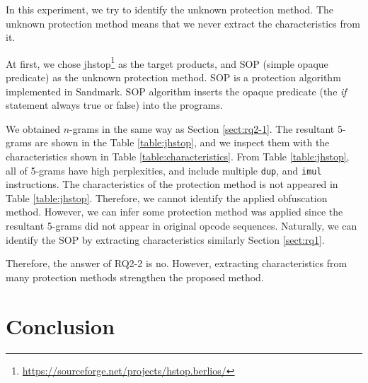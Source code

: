 \documentclass[conference]{IEEEtran}
\begin{document}
In this experiment, we try to identify the unknown protection method.
The unknown protection method means that we never extract the
characteristics from it.

At first, we chose
jhstop\footnote[6]{\url{https://sourceforge.net/projects/hstop.berlios/}}
as the target products, and SOP (simple opaque predicate) as the
unknown protection method.  SOP is a protection algorithm implemented
in Sandmark.  SOP algorithm inserts the opaque predicate (the
\emph{if} statement always true or false) into the programs.

We obtained $n$-grams in the same way as Section \ref{sect:rq2-1}. The
resultant 5-grams are shown in the Table \ref{table:jhstop}, and we
inspect them with the characteristics shown in Table
\ref{table:characteristics}.  From Table \ref{table:jhstop}, all of
5-grams have high perplexities, and include multiple \texttt{dup}, and
\texttt{imul} instructions.  The characteristics of the protection
method is not appeared in Table \ref{table:jhstop}.  Therefore, we
cannot identify the applied obfuscation method.
%
However, we can infer some protection method was applied since the
resultant 5-grams did not appear in original opcode sequences.
%
Naturally, we can identify the SOP by extracting characteristics
similarly Section \ref{sect:rq1}.

Therefore, the answer of RQ2-2 is no. However, extracting
characteristics from many protection methods strengthen the proposed
method.

% 
% 
% 


\section{Conclusion}\label{sect:conclusion}
\end{document}

